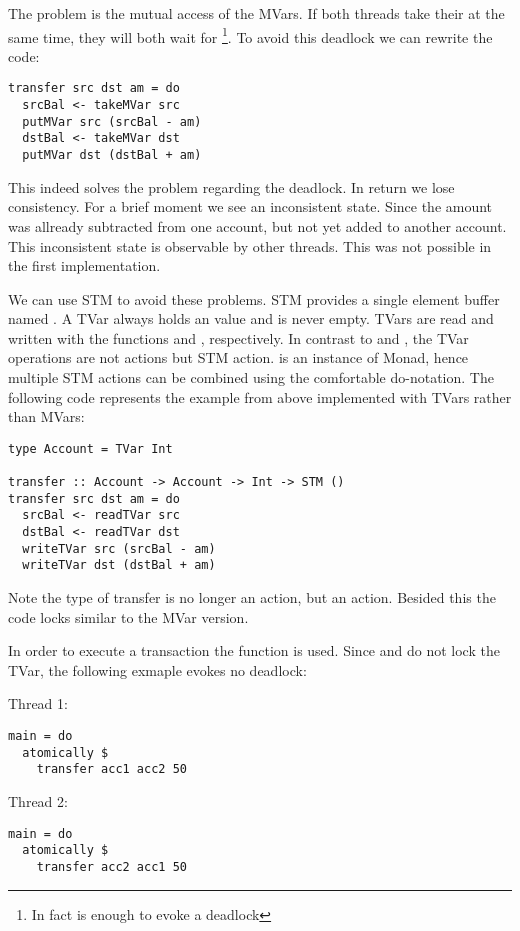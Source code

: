 The problem is the mutual access of the MVars. If both threads take their  at the same time, they will both wait for 
\footnote{In fact is  enough to evoke a deadlock}. To avoid this deadlock we can rewrite the code:
\begin{lstlisting}
transfer src dst am = do
  srcBal <- takeMVar src
  putMVar src (srcBal - am)
  dstBal <- takeMVar dst
  putMVar dst (dstBal + am)
\end{lstlisting}
This indeed solves the problem regarding the deadlock. In return we lose consistency. For a brief moment we see an inconsistent state. Since
the amount was allready subtracted from one account, but not yet added to another account. This inconsistent state is observable by other 
threads. This was not possible in the first implementation. 

We can use STM to avoid these problems. STM provides a single element buffer named . A TVar always holds an value and is never 
empty. TVars are read and written with the functions  and , respectively. 
In contrast to  and , the TVar operations are not  actions but STM action. 
 is an instance of Monad, hence multiple STM actions can be combined
using the comfortable do-notation. The following code represents the example from above implemented with TVars rather than MVars:
\begin{lstlisting}
type Account = TVar Int

transfer :: Account -> Account -> Int -> STM ()
transfer src dst am = do
  srcBal <- readTVar src
  dstBal <- readTVar dst
  writeTVar src (srcBal - am)
  writeTVar dst (dstBal + am)
\end{lstlisting}
Note the type of transfer is no longer an  action, but an  action. Besided this the code locks
similar to the MVar version.

In order to execute a transaction the function  is used. 
Since  and  do not lock the TVar, the following exmaple evokes no deadlock:
\par\noindent
\begin{minipage}[t]{.45\textwidth}
Thread 1:
\begin{lstlisting}[frame=lrtb]
main = do
  atomically $
    transfer acc1 acc2 50
\end{lstlisting}
\end{minipage}
\hfill
\begin{minipage}[t]{.45\textwidth}
Thread 2:
\begin{lstlisting}[frame=lrtb]
main = do 
  atomically $ 
    transfer acc2 acc1 50
\end{lstlisting}
\end{minipage}

